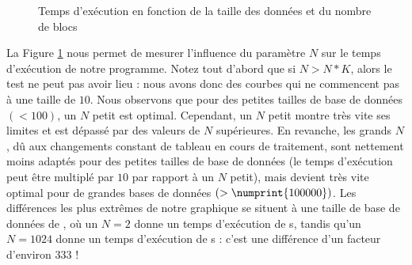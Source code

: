 \documentclass[12pt]{article}
\begin{document}
\begin{figure}
    \begin{center}
        \caption{Temps d'exécution en fonction de la taille des données et du nombre de blocs}
        \label{time-to-data-size-and-blocks}
    \end{center}
\end{figure}

La Figure \ref{time-to-data-size-and-blocks} nous permet de mesurer l'influence
du paramètre $N$ sur le temps d'exécution de notre programme. Notez tout d'abord
que si $N > N*K$, alors le test ne peut pas avoir lieu : nous avons donc des
courbes qui ne commencent pas à une taille de $10$. Nous observons que pour des
petites tailles de base de données $(< 100)$, un $N$ petit est optimal.
Cependant, un $N$ petit montre très vite ses limites et est dépassé par des
valeurs de $N$ supérieures. En revanche, les grands $N$, dû aux changements
constant de tableau en cours de traitement, sont nettement moins adaptés pour
des petites tailles de base de données (le temps d'exécution peut être multiplé
par $10$ par rapport à un $N$ petit), mais devient très vite optimal pour de
grandes bases de données $(> \numprint{100000})$. Les différences les plus
extrêmes de notre graphique se situent à une taille de base de données de
, où un $N=2$ donne un temps d'exécution de
\si{\second}, tandis qu'un $N=1024$ donne un temps d'exécution de
\si{\second} : c'est une différence d'un facteur d'environ $333$ !
\end{document}
